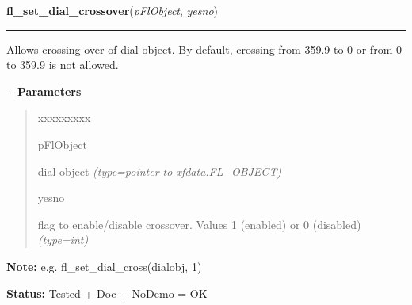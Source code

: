 \hspace{.8\funcindent}\begin{boxedminipage}{\funcwidth}

    \raggedright \textbf{fl\_set\_dial\_crossover}(\textit{pFlObject}, \textit{yesno})

    \vspace{-1.5ex}

    \rule{\textwidth}{0.5\fboxrule}
\setlength{\parskip}{2ex}

Allows crossing over of dial object. By default, crossing from
359.9 to 0 or from 0 to 359.9 is not allowed.

-{}-
\setlength{\parskip}{1ex}
      \textbf{Parameters}
      \vspace{-1ex}

      \begin{quote}
        \begin{Ventry}{xxxxxxxxx}

          \item[pFlObject]


dial object
            {\it (type=pointer to xfdata.FL\_OBJECT)}

          \item[yesno]


flag to enable/disable crossover. Values 1 (enabled) or 0 (disabled)
            {\it (type=int)}

        \end{Ventry}

      \end{quote}

\textbf{Note:} 
e.g. fl\_set\_dial\_cross(dialobj, 1)


\textbf{Status:} 
Tested + Doc + NoDemo = OK


    \end{boxedminipage}

    \label{xformslib:fldial:fl_set_dial_direction}

    \vspace{0.5ex}


